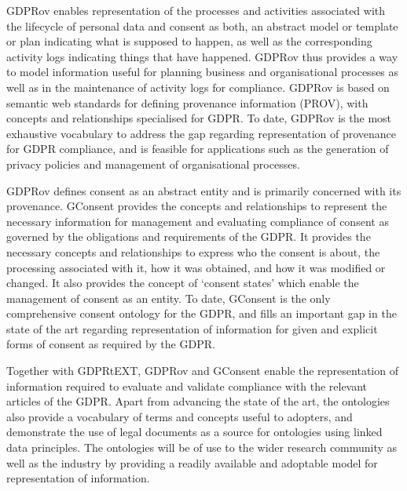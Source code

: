 GDPRov enables representation of the processes and activities associated with the lifecycle of personal data and consent as both, an abstract model or template or plan indicating what is supposed to happen, as well as the corresponding activity logs indicating things that have happened.  GDPRov thus provides a way to model information useful for planning business and organisational processes as well as in the maintenance of activity logs for compliance.
GDPRov is based on semantic web standards for defining provenance information (PROV), with concepts and relationships specialised for GDPR. To date, GDPRov is the most exhaustive vocabulary to address the gap regarding representation of provenance for GDPR compliance, and is feasible for applications such as the generation of privacy policies and management of organisational processes.

GDPRov defines consent as an abstract entity and is primarily concerned with its provenance. GConsent provides the concepts and relationships to represent the necessary information for management and evaluating compliance of consent as governed by the obligations and requirements of the GDPR. It provides the necessary concepts and relationships to express who the consent is about, the processing associated with it, how it was obtained, and how it was modified or changed. It also provides the concept of `consent states' which enable the management of consent as an entity. To date, GConsent is the only comprehensive consent ontology for the GDPR, and fills an important gap in the state of the art regarding representation of information for given and explicit forms of consent as required by the GDPR.

Together with GDPRtEXT, GDPRov and GConsent enable the representation of information required to evaluate and validate compliance with the relevant articles of the GDPR. Apart from advancing the state of the art, the ontologies also provide a vocabulary of terms and concepts useful to adopters, and demonstrate the use of legal documents as a source for ontologies using linked data principles. The ontologies will be of use to the wider research community as well as the industry by providing a readily available and adoptable model for representation of information.

